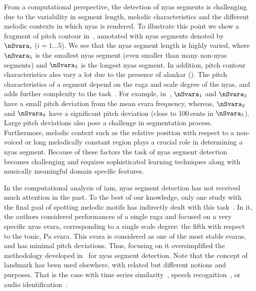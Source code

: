 {From a computational perspective, the detection of \gls{nyas} segments is challenging due to the variability in segment length, melodic characteristics and the different melodic contexts in which \gls{nyas} is rendered. To illustrate this point we show a fragment of pitch contour in~, annotated with \gls{nyas} segments denoted by $\nSvara_i$ ($i={1...5}$). We see that the \gls{nyas} segment length is highly varied, where $\nSvara_5$ is the smallest \gls{nyas} segment (even smaller than many non-\gls{nyas} segments) and $\nSvara_3$ is the longest \gls{nyas} segment. In addition, pitch contour characteristics also vary a lot due to the presence of \gls{alankar} (). The pitch characteristics of a segment depend on the \gls{raga} and scale degree of the \gls{nyas}, and adds further complexity to the task~\citep{Bagchee1998}. For example, in~, $\nSvara_1$ and $\nSvara_3$ have a small pitch deviation from the mean \gls{svara} frequency, whereas, $\nSvara_2$ and $\nSvara_4$ have a significant pitch deviation (close to 100\,cents in $\nSvara_5$). Large pitch deviations also pose a challenge in segmentation process. Furthermore, melodic context such as the relative position with respect to a non-voiced or long melodically constant region plays a crucial role in determining a \gls{nyas} segment. Because of these factors the task of \gls{nyas} segment detection becomes challenging and requires sophisticated learning techniques along with musically meaningful domain specific features.

In the computational analysis of \gls{iam}, \gls{nyas} segment detection has not received much attention in the past. To the best of our knowledge, only one study with the final goal of spotting melodic motifs has indirectly dealt with this task~\citep{Ross2012}. In it, the authors considered performances of a single \gls{raga} and focused on a very specific \gls{nyas} \gls{svara}, corresponding to a single scale degree: the fifth with respect to the tonic, Pa \gls{svara}. This \gls{svara} is considered as one of the most stable \glspl{svara}, and has minimal pitch deviations. Thus, focusing on it oversimplified the methodology developed in~\cite{Ross2012} for \gls{nyas} segment detection. Note that the concept of landmark has been used elsewhere, with related but different notions and purposes. That is the case with time series similarity~\citep{Perng00ICDE}, speech recognition~\citep{Jansen08JASA,Chen12ICASSP}, or audio identification~\citep{Duong13ICASSP}.

}
